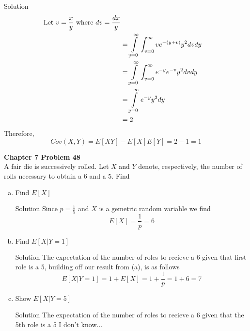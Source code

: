 \documentclass{article}
\begin{document}
\begin{spacing}{1.1}
\begin{homeworkProblem}
\begin{homeworkSection}{Solution}
\begin{align*}
      \text{Let $ v = \frac{ x}{ y}$ where $dv = \frac{ dx}{ y}$}\\
      &= \int\limits_{y = 0}^\infty \int_{v = 0}^\infty v e^{-(y + v)} y^2 dv dy\\
      &= \int\limits_{y = 0}^\infty \int_{v = 0}^\infty e^{-y} e^{-v} y^2 dv dy\\
      &= \int\limits_{y = 0}^\infty  e^{-y} y^2 dy\\
      &= 2
    \end{align*}
    Therefore, \[Cov(X, Y) = E[XY] - E[X]E[Y] = 2 - 1 = 1\]
  \end{homeworkSection}
\end{homeworkProblem}

\newpage
\begin{homeworkProblem}
  {\bf Chapter 7 Problem 48}\\
  A fair die is successively rolled. Let $X$ and $Y$ denote, 
  respectively, the number of rolls necessary to obtain a 
  6 and a 5. Find
  \begin{enumerate}[(a)]
    \item Find $E[X]$
      \begin{homeworkSection}{Solution}
        Since $p = \frac{ 1}{ 5}$ and $X$ is a gemetric random variable we find
        \[E[ X] = \frac{ 1}{ p} = 6\]
      \end{homeworkSection}
    \item Find $E[X|Y = 1]$
      \begin{homeworkSection}{Solution}
        The expectation of the number of roles to recieve a 6 given that first
        role is a 5, building off our result from (a), is as follows
        \[E[ X|Y = 1] = 1 + E[ X] = 1 + \frac{ 1}{ p} = 1 + 6 = 7\]
      \end{homeworkSection}
    \item Show $E[X|Y = 5]$
      \begin{homeworkSection}{Solution}
        The expectation of the number of roles to recieve a 6 given that the 5th role is a 5
        I don't know...
      \end{homeworkSection}
  \end{enumerate}
\end{homeworkProblem}


\end{spacing}
\end{document}
